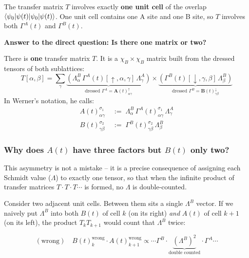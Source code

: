 \documentclass[11pt, a4paper]{article}
\begin{document}
The transfer matrix $T$ involves exactly \textbf{one unit cell} of the overlap $\braket{\psi_0|\psi(t)}$. One unit cell contains one A site and one B site, so $T$ involves both $\Gamma^A(t)$ and $\Gamma^B(t)$.

\textbf{Answer to the direct question: Is there one matrix or two?}

There is \textbf{one} transfer matrix $T$. It is a $\chi_B \times \chi_B$ matrix built from the dressed tensors of both sublattices:
\begin{equation}
  T[\alpha, \beta] = \sum_{\gamma}
  \underbrace{\left(\Lambda^B_\alpha\, \Gamma^A(t)[\uparrow, \alpha, \gamma]\, \Lambda^A_\gamma\right)}_{\text{dressed } \Gamma^A = \mathbf{A}(t)^{\uparrow}_{\alpha\gamma}}
  \times
  \underbrace{\left(\Gamma^B(t)[\downarrow, \gamma, \beta]\, \Lambda^B_\beta\right)}_{\text{dressed } \Gamma^B = \mathbf{B}(t)^{\downarrow}_{\gamma\beta}}
  \label{eq:transfer}
\end{equation}
In Werner's notation, he calls:
\begin{align}
  A(t)^{\sigma_1}_{\alpha\gamma} &\;:=\; \Lambda^B_\alpha\, \Gamma^A(t)^{\sigma_1}_{\alpha\gamma}\, \Lambda^A_\gamma \label{eq:werner_A} \\
  B(t)^{\sigma_2}_{\gamma\beta}  &\;:=\; \Gamma^B(t)^{\sigma_2}_{\gamma\beta}\, \Lambda^B_\beta       \label{eq:werner_B}
\end{align}

\subsubsection*{Why does $A(t)$ have three factors but $B(t)$ only two?}

This asymmetry is not a mistake -- it is a precise consequence of assigning each Schmidt value ($\Lambda$) to exactly one tensor, so that when the infinite product of transfer matrices $T \cdot T \cdot T \cdots$ is formed, no $\Lambda$ is double-counted.

Consider two adjacent unit cells. Between them sits a single $\Lambda^B$ vector. If we naively put $\Lambda^B$ into both $B(t)$ of cell $k$ (on its right) \emph{and} $A(t)$ of cell $k+1$ (on its left), the product $T_k T_{k+1}$ would count that $\Lambda^B$ twice:

\begin{equation}
  (\text{wrong}) \quad B(t)^{\text{wrong}}_{k} \cdot A(t)^{\text{wrong}}_{k+1} \propto \cdots \Gamma^B \cdot \underbrace{(\Lambda^B)^2}_{\text{double counted}} \cdot \Gamma^A \cdots
\end{equation}
\end{document}

